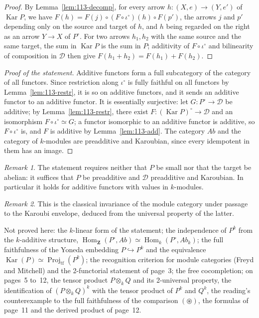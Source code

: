 \documentclass[11pt]{article}
\theoremstyle{plain}
\theoremstyle{definition}
\theoremstyle{remark}
\newtheorem*{remarque}{Remark}
\begin{document}
\begin{proof}
By Lemma~\ref{lem:113-decomp}, for every arrow $h : (X, e) \to (Y, e')$ of $\operatorname{Kar} P$, we have $F(h) = F(j) \circ (F \circ \iota^\circ)(h) \circ F(p')$, the arrows $j$ and $p'$ depending only on the source and target of $h$, and $h$ being regarded on the right as an arrow $Y \to X$ of $P^\circ$. For two arrows $h_1, h_2$ with the same source and the same target, the sum in $\operatorname{Kar} P$ is the sum in $P$; additivity of $F \circ \iota^\circ$ and bilinearity of composition in $\mathcal D$ then give $F(h_1 + h_2) = F(h_1) + F(h_2)$.
\end{proof}

\begin{proof}[Proof of the statement]
Additive functors form a full subcategory of the category of all functors. Since restriction along $\iota^\circ$ is fully faithful on all functors by Lemma~\ref{lem:113-restr}, it is so on additive functors, and it sends an additive functor to an additive functor. It is essentially surjective: let $G : P^\circ \to \mathcal D$ be additive; by Lemma~\ref{lem:113-restr}, there exist $F : (\operatorname{Kar} P)^\circ \to \mathcal D$ and an isomorphism $F \circ \iota^\circ \simeq G$; a functor isomorphic to an additive functor is additive, so $F \circ \iota^\circ$ is, and $F$ is additive by Lemma~\ref{lem:113-add}. The category $Ab$ and the category of $k$-modules are preadditive and Karoubian, since every idempotent in them has an image.
\end{proof}

\begin{remarque}
The statement requires neither that $P$ be small nor that the target be abelian: it suffices that $P$ be preadditive and $\mathcal D$ preadditive and Karoubian. In particular it holds for additive functors with values in $k$-modules.
\end{remarque}

\begin{remarque}
This is the classical invariance of the module category under passage to the Karoubi envelope, deduced from the universal property of the latter.
\end{remarque}

\noindent Not proved here: the $k$-linear form of the statement; the independence of $P^k$ from the $k$-additive structure, $\operatorname{Hom}_{\mathbf Z}(P^\circ, Ab) \simeq \operatorname{Hom}_k(P^\circ, Ab_k)$; the full faithfulness of the Yoneda embedding $P \hookrightarrow P^k$ and the equivalence $\operatorname{Kar}(P) \simeq \operatorname{Proj}_{\mathrm{tf}}(P^k)$; the recognition criterion for module categories (Freyd and Mitchell) and the 2-functorial statement of page~3; the free cocompletion; on pages~5 to~12, the tensor product $P \otimes_k Q$ and its 2-universal property, the identification of $(P \otimes_k Q)^k$ with the tensor product of $P^k$ and $Q^k$, the reading's counterexample to the full faithfulness of the comparison $(\circledast)$, the formulas of page~11 and the derived product of page~12.
\end{document}
